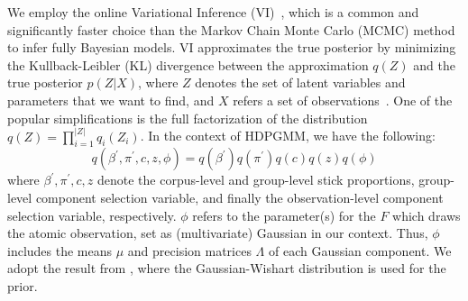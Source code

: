 \documentclass{article}
\begin{document}
We employ the online Variational Inference (VI)~\cite{DBLP:journals/jmlr/WangPB11}, which is a common and significantly faster choice than the Markov Chain Monte Carlo (MCMC) method to infer fully Bayesian models. VI approximates the true posterior by minimizing the Kullback-Leibler (KL) divergence between the approximation $q(Z)$ and the true posterior $p(Z|X)$, where $Z$ denotes the set of latent variables and parameters that we want to find, and $X$ refers a set of observations~\cite{bishop2006pattern}.
One of the popular simplifications is the full factorization of the distribution $q(Z) = \prod^{|Z|}_{i=1} q_{i}(Z_{i})$. In the context of HDPGMM, we have the following:
\begin{equation}\label{eq:meanfield_vi_hdpgmm}
    q(\beta^{\prime}, \pi^{\prime}, c, z, \phi) = q(\beta^{\prime})q(\pi^{\prime})q(c)q(z)q(\phi)
\end{equation}
where $\beta^{\prime}, \pi^{\prime}, c, z$ denote the corpus-level and group-level stick proportions, group-level component selection variable, and finally the observation-level component selection variable, respectively. $\phi$ refers to the parameter(s) for the $F$ which draws the atomic observation, set as (multivariate) Gaussian in our context. Thus, $\phi$ includes the means $\mu$ and precision matrices $\Lambda$ of each Gaussian component. We adopt the result from \cite{bishop2006pattern}, where the Gaussian-Wishart distribution is used for the prior.
\end{document}
